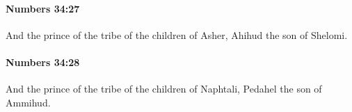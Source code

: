 		\paragraph{Numbers 34:27} %
			\label{NUMBERS-34-27}

			And the prince of the tribe of the children of Asher, Ahihud the son of Shelomi.


		\paragraph{Numbers 34:28} %
			\label{NUMBERS-34-28}

			And the prince of the tribe of the children of Naphtali, Pedahel the son of Ammihud.



